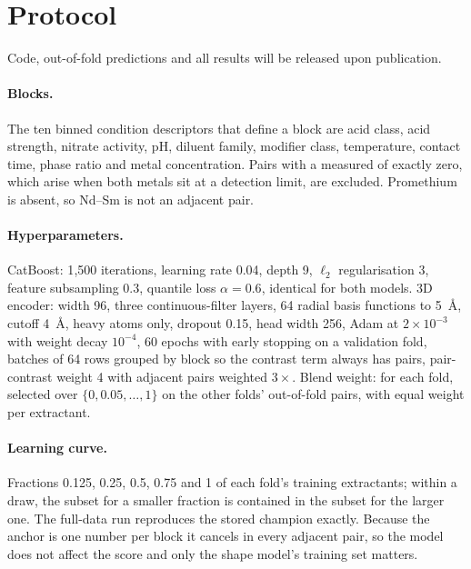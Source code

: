 \appendix
\section{Protocol}
\label{app:protocol}
Code, out-of-fold predictions and all results will be released upon publication.
\paragraph{Blocks.} The ten binned condition descriptors that define a block are acid class, acid strength, nitrate activity, pH, diluent family, modifier class, temperature, contact time, phase ratio and metal concentration. Pairs with a measured \logSF{} of exactly zero, which arise when both metals sit at a detection limit, are excluded. Promethium is absent, so Nd--Sm is not an adjacent pair.
\paragraph{Hyperparameters.} CatBoost: 1{,}500 iterations, learning rate 0.04, depth 9, $\ell_2$ regularisation 3, feature subsampling 0.3, quantile loss $\alpha = 0.6$, identical for both models. 3D encoder: width 96, three continuous-filter layers, 64 radial basis functions to 5~\AA{}, cutoff 4~\AA{}, heavy atoms only, dropout 0.15, head width 256, Adam at $2 \times 10^{-3}$ with weight decay $10^{-4}$, 60 epochs with early stopping on a validation fold, batches of 64 rows grouped by block so the contrast term always has pairs, pair-contrast weight 4 with adjacent pairs weighted $3\times$. Blend weight: for each fold, selected over $\{0, 0.05, \dots, 1\}$ on the other folds' out-of-fold pairs, with equal weight per extractant.
\paragraph{Learning curve.} Fractions 0.125, 0.25, 0.5, 0.75 and 1 of each fold's training extractants; within a draw, the subset for a smaller fraction is contained in the subset for the larger one. The full-data run reproduces the stored champion exactly. Because the anchor is one number per block it cancels in every adjacent pair, so the \logD{} model does not affect the score and only the shape model's training set matters.

